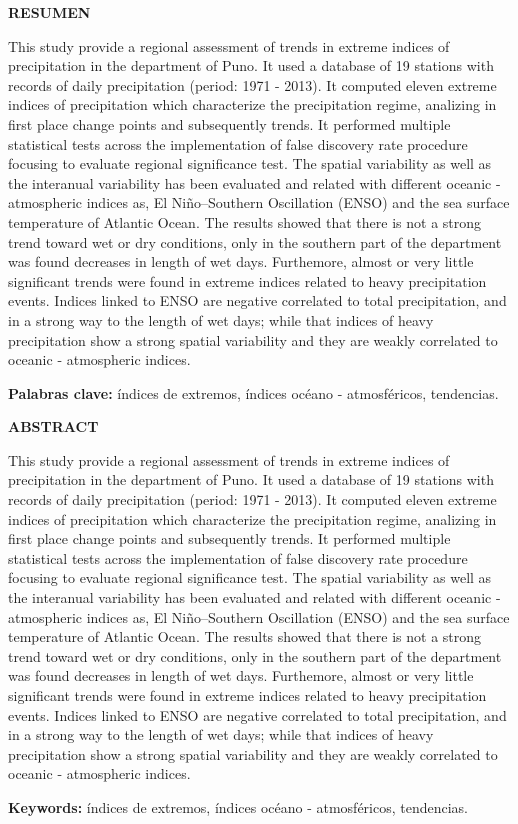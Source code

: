 \begin{center}
\large{\textbf {RESUMEN}}
\end{center}

This study provide a regional assessment of trends in extreme indices of precipitation in the department of Puno. It used a database of 19 stations with records of daily precipitation (period: 1971 - 2013). It computed eleven extreme indices of precipitation which characterize the precipitation regime, analizing in first place change points and subsequently trends. It performed multiple statistical tests across the implementation of false discovery rate procedure focusing to evaluate regional significance test. The spatial variability as well as the interanual variability has been evaluated and related with different oceanic - atmospheric indices as, El Niño–Southern Oscillation (ENSO) and the sea surface temperature of Atlantic Ocean. The results showed that there is not a strong trend toward wet or dry conditions, only in the southern part of the department was found decreases in length of wet days. Furthemore, almost or very little significant trends were found in extreme indices related to heavy precipitation events. Indices linked to ENSO are negative correlated to total precipitation, and in a strong way to the length of wet days; while that indices of heavy precipitation show a strong spatial variability and they are weakly correlated to oceanic - atmospheric indices.

\textbf {Palabras clave:} índices de extremos, índices océano - atmosféricos, tendencias.

\clearpage

\begin{center}
\large{\textbf {ABSTRACT}}
\end{center}

This study provide a regional assessment of trends in extreme indices of precipitation in the department of Puno. It used a database of 19 stations with records of daily precipitation (period: 1971 - 2013). It computed eleven extreme indices of precipitation which characterize the precipitation regime, analizing in first place change points and subsequently trends. It performed multiple statistical tests across the implementation of false discovery rate procedure focusing to evaluate regional significance test. The spatial variability as well as the interanual variability has been evaluated and related with different oceanic - atmospheric indices as, El Niño–Southern Oscillation (ENSO) and the sea surface temperature of Atlantic Ocean. The results showed that there is not a strong trend toward wet or dry conditions, only in the southern part of the department was found decreases in length of wet days. Furthemore, almost or very little significant trends were found in extreme indices related to heavy precipitation events. Indices linked to ENSO are negative correlated to total precipitation, and in a strong way to the length of wet days; while that indices of heavy precipitation show a strong spatial variability and they are weakly correlated to oceanic - atmospheric indices.

\textbf {Keywords:} índices de extremos, índices océano - atmosféricos, tendencias.

\clearpage